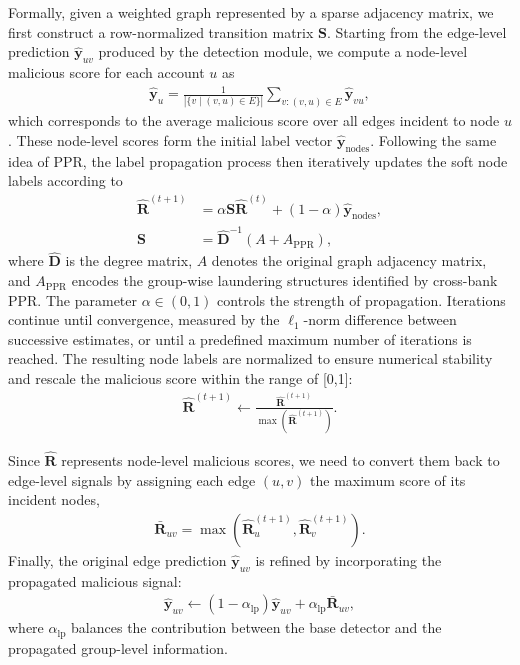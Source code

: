 Formally, given a weighted graph represented by a sparse adjacency matrix, we first construct a row-normalized transition matrix $\mathbf{S}$. Starting from the edge-level prediction $\hat{\mathbf{y}}_{uv}$ produced by the detection module, we compute a node-level malicious score for each account $u$ as
\begin{align}
    \hat{\mathbf{y}}_u = \frac{1}{|\{v \mid (v,u)\in E\}|} \sum_{v:(v,u)\in E} \hat{\mathbf{y}}_{vu},
\end{align}
which corresponds to the average malicious score over all edges incident to node $u$. These node-level scores form the initial label vector $\hat{\mathbf{y}}_{\text{nodes}}$.
Following the same idea of PPR, the label propagation process then iteratively updates the soft node labels according to
\begin{align}
    \mathbf{\hat{R}}^{(t+1)} &= \alpha \mathbf{S}\mathbf{\hat{R}}^{(t)} + (1-\alpha)\hat{\mathbf{y}}_{\text{nodes}}, \\
    \nonumber \mathbf{S} &= \mathbf{\hat{D}}^{-1}(A + A_{\text{PPR}}),
\end{align}
where $\mathbf{\hat{D}}$ is the degree matrix, $A$ denotes the original graph adjacency matrix, and $A_{\text{PPR}}$ encodes the group-wise laundering structures identified by cross-bank PPR. The parameter $\alpha \in (0,1)$ controls the strength of propagation. Iterations continue until convergence, measured by the $\ell_1$-norm difference between successive estimates, or until a predefined maximum number of iterations is reached. The resulting node labels are normalized to ensure numerical stability and rescale the malicious score within the range of [0,1]:
\begin{align}
    \mathbf{\hat{R}}^{(t+1)} \leftarrow \frac{\mathbf{\hat{R}}^{(t+1)}}{\max(\mathbf{\hat{R}}^{(t+1)})}.
\end{align}

Since $\mathbf{\hat{R}}$ represents node-level malicious scores, we need to convert them back to edge-level signals by assigning each edge $(u,v)$ the maximum score of its incident nodes,
\begin{align}
    \mathbf{\bar{R}}_{uv} = \max\left(\mathbf{\hat{R}}^{(t+1)}_u, \mathbf{\hat{R}}^{(t+1)}_v\right).
\end{align}
Finally, the original edge prediction $\hat{\mathbf{y}}_{uv}$ is refined by incorporating the propagated malicious signal:
\begin{align}
    \hat{\mathbf{y}}_{uv} \leftarrow (1-\alpha_{\text{lp}})\hat{\mathbf{y}}_{uv} + \alpha_{\text{lp}}\mathbf{\bar{R}}_{uv},
\end{align}
where $\alpha_{\text{lp}}$ balances the contribution between the base detector and the propagated group-level information.


